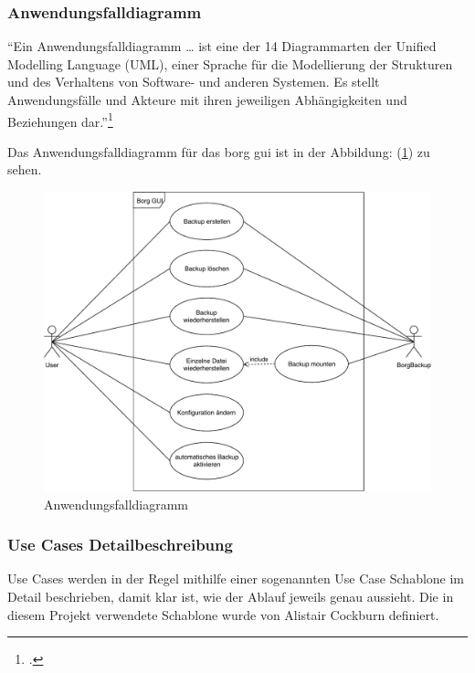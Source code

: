\subsubsection{Anwendungsfalldiagramm}
\label{sec:org1e310b4}

"`Ein Anwendungsfalldiagramm \ldots{} ist eine der 14 Diagrammarten der
Unified Modelling Language (UML), einer Sprache für die Modellierung
der Strukturen und des Verhaltens von Software- und anderen Systemen.
Es stellt Anwendungsfälle und Akteure mit ihren jeweiligen
Abhängigkeiten und Beziehungen dar."'\footcite{usecasediagramm}

Das Anwendungsfalldiagramm für das \gls{borg} \gls{gui} ist in der Abbildung:
(\ref{fig:orgac72df5}) zu sehen.

\newpage
\begin{landscape}
\begin{figure}[htbp]
\centering
\includegraphics[width=.9\linewidth]{pictures/use_case.pdf}
\caption{\label{fig:orgac72df5}
Anwendungsfalldiagramm}
\end{figure}
\end{landscape}
\newpage

\subsubsection{Use Cases Detailbeschreibung}
\label{sec:orgf807122}

Use Cases werden in der Regel mithilfe einer sogenannten Use Case Schablone im
Detail beschrieben, damit klar ist, wie der Ablauf jeweils genau aussieht. Die
in diesem Projekt verwendete Schablone wurde von Alistair Cockburn definiert.


